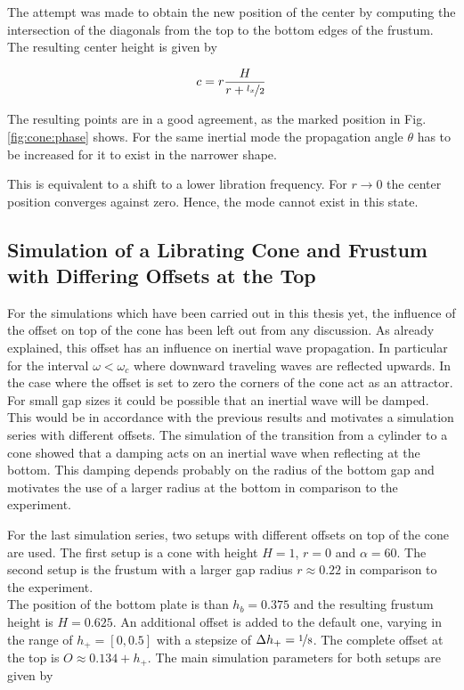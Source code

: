 The attempt was made to obtain the new position of the center
by computing the intersection of the diagonals from the top to the bottom edges of the frustum.
The resulting center height is given by

\begin{align}
\label{cone:wavenodeeqn}
c  = r \frac{H}{r+\nicefrac{l_x}{2}}
\end{align}

The resulting points are in a good agreement, as the marked position in Fig. \ref{fig:cone:phase} shows.
For the same inertial mode the propagation angle $\theta$ has to be
increased for it to exist in the narrower shape.

This is equivalent to a shift to a lower libration frequency.
For $r \rightarrow 0$ the center position converges against zero. Hence, the mode cannot exist in this state.

\subsection{Simulation of a Librating Cone and Frustum with Differing Offsets at the Top}

For the simulations which have been carried out in this thesis yet,
the influence of the offset on top of the cone has been left out from any discussion.
As already explained, this offset has an influence on inertial wave propagation.
In particular for the interval $\omega<\omega_c$ where  downward traveling waves are
reflected upwards.
In the case where the offset is set to zero the corners of the cone act as an attractor.
For small gap sizes it could be possible that an inertial wave will be damped.
This would be in accordance with the previous results and
motivates a simulation series with different offsets.
The simulation of the transition from a cylinder to a cone showed
that a damping acts on an inertial wave when reflecting at the bottom.
This damping depends probably on the radius of the bottom gap
and motivates the use of a larger radius at the bottom in comparison to the experiment.

For the last simulation series, two setups with different offsets on top of the cone are used.
The first setup is a cone with height $H=1$, $r=0$ and $\alpha=60$.
The second setup is  the frustum with a larger gap radius $r\approx0.22$ in comparison to the experiment.\\
The position of the bottom plate is than $h_b=0.375$ and the resulting frustum height is $H=0.625$.
An additional offset is added to the default one,
varying in the range of $h_+ = [0, 0.5]$ with a stepsize of $\Delta h_+ = \nicefrac{1}{8}$.
The complete offset at the top is $O \approx 0.134 + h_+$.
The main simulation parameters for both setups are given by

